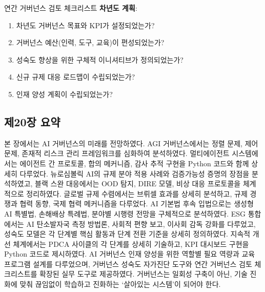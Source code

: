 \begin{practicaltool}{연간 거버넌스 검토 체크리스트}
\textbf{차년도 계획}:
\begin{enumerate}
 \item 차년도 거버넌스 목표와 KPI가 설정되었는가?
 \item 거버넌스 예산(인력, 도구, 교육)이 편성되었는가?
 \item 성숙도 향상을 위한 구체적 이니셔티브가 정의되었는가?
 \item 신규 규제 대응 로드맵이 수립되었는가?
 \item 인재 양성 계획이 수립되었는가?
\end{enumerate}
\end{practicaltool}

\subsection*{제20장 요약}

본 장에서는 AI 거버넌스의 미래를 전망하였다. AGI 거버넌스에서는 정렬 문제, 제어 문제, 존재적 리스크 관리 프레임워크를 심화하여 분석하였다. 멀티에이전트 시스템에서는 에이전트 간 프로토콜, 합의 메커니즘, 감사 추적 구현을 Python 코드와 함께 상세히 다루었다. 뉴로심볼릭 AI의 규제 분야 적용 사례와 검증가능성 증명의 장점을 분석하였고, 블랙 스완 대응에서는 OOD 탐지, DIRE 모델, 비상 대응 프로토콜을 체계적으로 정리하였다. 글로벌 규제 수렴에서는 브뤼셀 효과를 상세히 분석하고, 규제 경쟁과 협력 동향, 국제 협력 메커니즘을 다루었다. AI 기본법 후속 입법으로는 생성형 AI 특별법, 손해배상 특례법, 분야별 시행령 전망을 구체적으로 분석하였다. ESG 통합에서는 AI 탄소발자국 측정 방법론, 사회적 편향 보고, 이사회 감독 강화를 다루었고, 성숙도 모델은 각 단계별 핵심 활동과 단계 전환 기준을 상세히 정의하였다. 지속적 개선 체계에서는 PDCA 사이클의 각 단계를 상세히 기술하고, KPI 대시보드 구현을 Python 코드로 제시하였다. AI 거버넌스 인재 양성을 위한 역할별 필요 역량과 교육 프로그램 설계를 다루었으며, 거버넌스 성숙도 자가진단 도구와 연간 거버넌스 검토 체크리스트를 확장된 실무 도구로 제공하였다. 거버넌스는 일회성 구축이 아닌, 기술 진화에 맞춰 끊임없이 학습하고 진화하는 `살아있는 시스템'이 되어야 한다.
